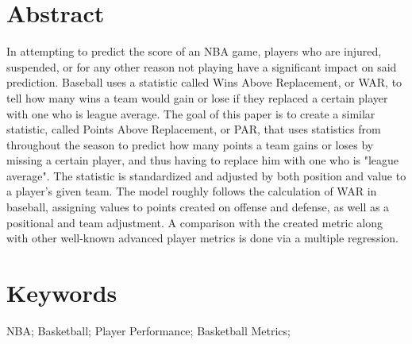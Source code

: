 \documentclass[12pt]{article}
\begin{document}
\section*{Abstract}
In attempting to predict the score of an NBA game, players who are injured, suspended, or for any other 
reason not playing have a significant impact on said prediction. Baseball uses a statistic called Wins Above 
Replacement, or WAR, to tell how many wins a team would gain or lose if they replaced a certain player 
with one who is league average. The goal of this paper is to create a similar statistic, called Points Above 
Replacement, or PAR, that uses statistics from throughout the season to predict how many points a team 
gains or loses by missing a certain player, and thus having to replace him with one who is "league 
average". The statistic is standardized and adjusted by both position and value to a player's given team. 
The model roughly follows the calculation of WAR in baseball, assigning values to points created on offense 
and defense, as well as a positional and team adjustment. A comparison with the created metric along with 
other well-known advanced player metrics is done via a multiple regression.

\section*{Keywords} 
NBA; Basketball; Player Performance; Basketball Metrics;
\vspace{.12 in}
\end{document}

